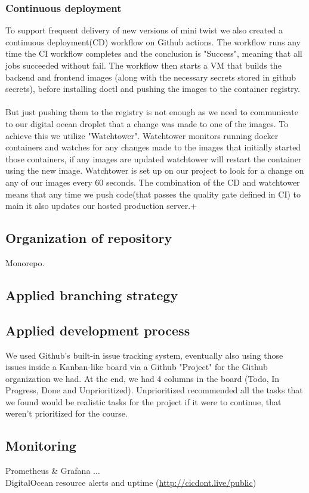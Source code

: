 \subsubsection{Continuous deployment}
To support frequent delivery of new versions of mini twist we also created a continuous deployment(CD) workflow on Github actions. The workflow runs any time the CI workflow completes and the conclusion is "Success", meaning that all jobs succeeded without fail. The workflow then starts a VM that builds the backend and frontend images (along with the necessary secrets stored in github secrets), before installing doctl and pushing the images to the container registry.\\\\
But just pushing them to the registry is not enough as we need to communicate to our digital ocean droplet that a change was made to one of the images. To achieve this we utilize "Watchtower"\cite{watchtower}. Watchtower monitors running docker containers and watches for any changes made to the images that initially started those containers, if any images are updated watchtower will restart the container using the new image. Watchtower is set up on our project to look for a change on any of our images every 60 seconds. The combination of the CD and watchtower means that any time we push code(that passes the quality gate defined in CI) to main it also updates our hosted production server.+  


\subsection{Organization of repository}
Monorepo. 
\subsection{Applied branching strategy}
\subsection{Applied development process}
We used Github's built-in issue tracking system, eventually also using those issues inside a Kanban-like board via a Github "Project" for the Github organization we had. At the end, we had 4 columns in the board (Todo, In Progress, Done and Unprioritized). Unprioritized recommended all the tasks that we found would be realistic tasks for the project if it were to continue, that weren't prioritized for the course. 
\subsection{Monitoring}
Prometheus \& Grafana ... \\
DigitalOcean resource alerts and uptime (\url{http://cicdont.live/public})
